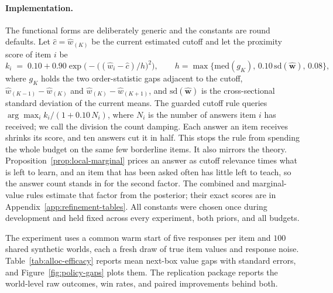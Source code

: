 \documentclass[11pt]{article}
\theoremstyle{definition}
\theoremstyle{remark}
\newcommand{\1}{\mathbf{1}}
\newcommand{\w}{\mathbf{w}}
\begin{document}
\paragraph{Implementation.}
The functional forms are deliberately generic and the constants are
round defaults. Let \(\hat c=\hat w_{(K)}\) be the current estimated cutoff and let the proximity score of item \(i\) be
\[
k_i \;=\; 0.10+0.90\exp\!\big(-\big((\hat w_i-\hat c)/h\big)^2\big),
\qquad
h=\max\{\mathrm{med}(g_K),\,0.10\,\mathrm{sd}(\hat{\w}),\,0.08\},
\]
where \(g_K\) holds the two order-statistic gaps adjacent to the cutoff, \(\hat w_{(K-1)}-\hat w_{(K)}\) and \(\hat w_{(K)}-\hat w_{(K+1)}\), and \(\mathrm{sd}(\hat{\w})\) is the cross-sectional standard deviation of the current means. The guarded cutoff rule queries \(\arg\max_i k_i/(1+0.10\,N_i)\), where \(N_i\) is the number of answers item \(i\) has received; we call the division the count damping. Each answer an item receives shrinks its score, and ten answers cut it
in half. This stops the rule from spending the whole budget on the same
few borderline items. It also mirrors the theory.
Proposition~\ref{prop:local-marginal} prices an answer as cutoff
relevance times what is left to learn, and an item that has been asked
often has little left to teach, so the answer count stands in for the
second factor. The combined and marginal-value rules estimate that
factor from the posterior; their exact scores are in
Appendix~\ref{app:refinement-tables}. All constants were chosen once during development and held fixed across every experiment, both priors, and all budgets.

The experiment uses a common warm start of five responses per item and
\(100\) shared synthetic worlds, each a fresh draw of true item values
and response noise. Table~\ref{tab:alloc-efficacy} reports mean
next-box value gaps with standard errors, and
Figure~\ref{fig:policy-gaps} plots them. The replication package
reports the world-level raw outcomes, win rates, and paired
improvements behind both.
\end{document}
